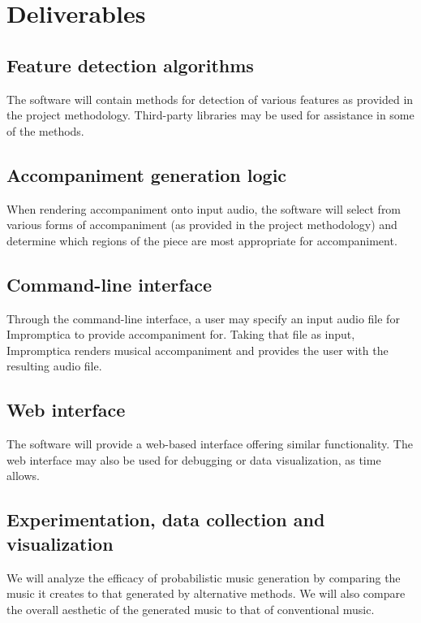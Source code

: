\documentclass[11pt,conference,letterpaper]{IEEEtran}
\begin{document}
\section{Deliverables}

\subsection{Feature detection algorithms}

The software will contain methods for detection of various features as provided in the project methodology. Third-party libraries may be used for assistance in some of the methods.

\subsection{Accompaniment generation logic}

When rendering accompaniment onto input audio, the software will select from various forms of accompaniment (as provided in the project methodology) and determine which regions of the piece are most appropriate for accompaniment.

\subsection{Command-line interface}

Through the command-line interface, a user may specify an input audio file for Impromptica to provide accompaniment for. Taking that file as input, Impromptica renders musical accompaniment and provides the user with the resulting audio file.

\subsection{Web interface}

The software will provide a web-based interface offering similar functionality. The web interface may also be used for debugging or data visualization, as time allows.

\subsection{Experimentation, data collection and visualization}

We will analyze the efficacy of probabilistic music generation by comparing the music it creates to that generated by alternative methods.  We will also compare the overall aesthetic of the generated music to that of conventional music.
\end{document}

